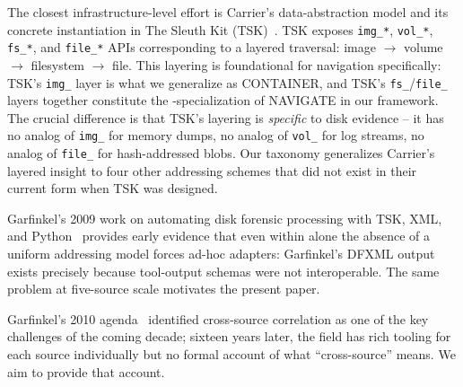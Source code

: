 The closest infrastructure-level effort is Carrier's data-abstraction model
and its concrete instantiation in The Sleuth Kit (TSK)~\cite{carrier2005file,tsk_repo}.
TSK exposes \texttt{img\_*}, \texttt{vol\_*}, \texttt{fs\_*}, and \texttt{file\_*}
APIs corresponding to a layered traversal: image $\to$ volume $\to$
filesystem $\to$ file. This layering is foundational for  navigation
specifically: TSK's \texttt{img\_} layer is what we generalize as CONTAINER,
and TSK's \texttt{fs\_}/\texttt{file\_} layers together constitute the
-specialization of NAVIGATE in our framework. The crucial difference
is that TSK's layering is \emph{specific} to disk evidence -- it has no
analog of \texttt{img\_} for memory dumps, no analog of \texttt{vol\_} for
log streams, no analog of \texttt{file\_} for hash-addressed blobs. Our
taxonomy generalizes Carrier's layered insight to four other addressing
schemes that did not exist in their current form when TSK was designed.

Garfinkel's 2009 work on automating disk forensic processing with TSK, XML,
and Python~\cite{garfinkel2009automating} provides early evidence that even
within  alone the absence of a uniform addressing model forces
ad-hoc adapters: Garfinkel's DFXML output exists precisely because tool-output
schemas were not interoperable. The same problem at five-source scale
motivates the present paper.

Garfinkel's 2010 agenda~\cite{garfinkel2010digital} identified cross-source
correlation as one of the key challenges of the coming decade; sixteen
years later, the field has rich tooling for each source individually but no
formal account of what ``cross-source'' means. We aim to provide that
account.

